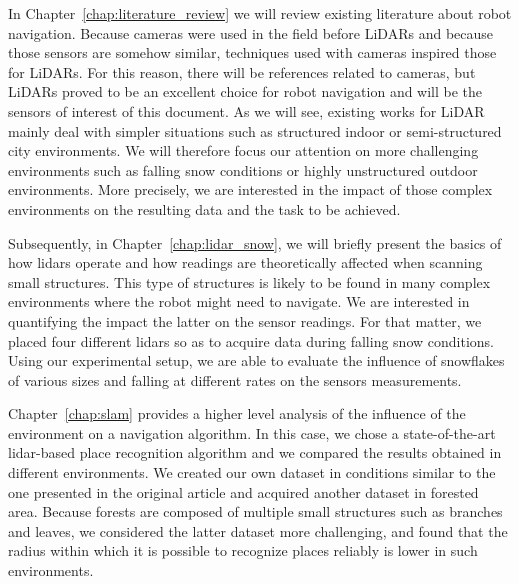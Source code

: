 In Chapter~\ref{chap:literature_review} we will review existing literature about robot navigation. Because cameras were used in the field before LiDARs and because those sensors are somehow similar, techniques used with cameras inspired those for LiDARs. For this reason, there will be references related to cameras, but LiDARs proved to be an excellent choice for robot navigation and will be the sensors of interest of this document. As we will see, existing works for LiDAR mainly deal with simpler situations such as structured indoor or semi-structured city environments. We will therefore focus our attention on more challenging environments such as falling snow conditions or highly unstructured outdoor environments. More precisely, we are interested in the impact of those complex environments on the resulting data and the task to be achieved.

Subsequently, in Chapter~\ref{chap:lidar_snow}, we will briefly present the basics of how \gls*{lidar}s operate and how readings are theoretically affected when scanning small structures. This type of structures is likely to be found in many complex environments where the robot might need to navigate. We are interested in quantifying the impact the latter on the sensor readings. For that matter, we placed four different \gls*{lidar}s so as to acquire data during falling snow conditions. Using our experimental setup, we are able to evaluate the influence of snowflakes of various sizes and falling at different rates on the sensors measurements. 

Chapter~\ref{chap:slam} provides a higher level analysis of the influence of the environment on a navigation algorithm. In this case, we chose a state-of-the-art \gls*{lidar}-based place recognition algorithm and we compared the results obtained in different environments. We created our own dataset in conditions similar to the one presented in the original article and acquired another dataset in forested area. Because forests are composed of multiple small structures such as branches and leaves, we considered the latter dataset more challenging, and found that the radius within which it is possible to recognize places reliably is lower in such environments.
